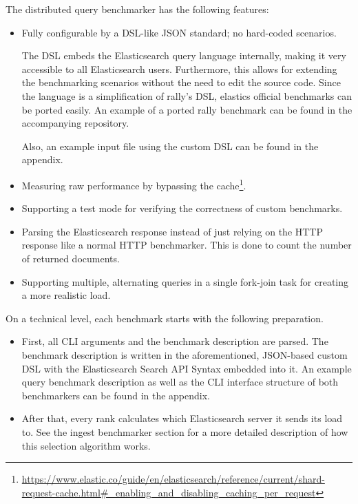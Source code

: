 The distributed query benchmarker has the following features:
\begin{itemize}
  \item Fully configurable by a \ac{DSL}-like \ac{JSON} standard; no hard-coded scenarios.

    The \ac{DSL} embeds the Elasticsearch query language internally, making it very accessible to all Elasticsearch users. Furthermore, this allows for extending the benchmarking scenarios without the need to edit the source code. Since the language is a simplification of rally's \ac{DSL}, elastics official benchmarks can be ported easily. An example of a ported rally benchmark can be found in the accompanying repository.

    Also, an example input file using the custom \ac{DSL} can be found in the appendix.
  \item Measuring raw performance by bypassing the cache\footnote{\url{https://www.elastic.co/guide/en/elasticsearch/reference/current/shard-request-cache.html\#_enabling_and_disabling_caching_per_request}}.
  \item Supporting a test mode for verifying the correctness of custom benchmarks.
  \item Parsing the Elasticsearch response instead of just relying on the HTTP response like a normal HTTP benchmarker. This is done to count the number of returned documents.
  \item Supporting multiple, alternating queries in a single fork-join task for creating a more realistic load.
\end{itemize}

On a technical level, each benchmark starts with the following preparation.
\begin{itemize}
  \item First, all \ac{CLI} arguments and the benchmark description are parsed. The benchmark description is written in the aforementioned, JSON-based custom DSL with the Elasticsearch Search API Syntax embedded into it. An example query benchmark description as well as the \ac{CLI} interface structure of both benchmarkers can be found in the appendix.
  \item After that, every rank calculates which Elasticsearch server it sends its load to. See the ingest benchmarker section for a more detailed description of how this selection algorithm works.
\end{itemize}

